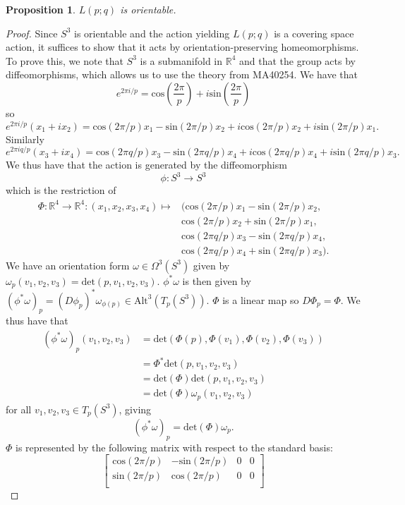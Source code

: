 \documentclass{article}
\newtheorem{proposition}[theorem]{Proposition}
\begin{document}
\begin{proposition}
$L(p;q)$ is orientable.
\end{proposition}
\begin{proof}
Since $S^3$ is orientable and the action yielding $L(p;q)$ is a covering space action, it suffices to show that it acts by orientation-preserving homeomorphisms. To prove this, we note that $S^3$ is a submanifold in $\mathbb{R}^4$ and that the group acts by diffeomorphisms, which allows us to use the theory from MA40254. We have that \[e^{2\pi i/p}=\text{cos}(\frac{2\pi}{p})+i\text{sin}(\frac{2\pi}{p})\]so\[e^{2\pi i/p}(x_1+ix_2)=\text{cos}(2\pi/p)x_1-\text{sin}(2\pi/p)x_2+i\text{cos}(2\pi /p)x_2+i\text{sin}(2\pi/p)x_1.\] Similarly \[e^{2\pi iq/p}(x_3+ix_4)=\text{cos}(2\pi q/p)x_3-\text{sin}(2\pi q/p)x_4+i\text{cos}(2\pi q/p)x_4+i\text{sin}(2\pi q/p)x_3.\] We thus have that the action is generated by the diffeomorphism \[\phi:S^3\to S^3\] which is the restriction of \begin{align*}\Phi:\mathbb{R}^4\to \mathbb{R}^4\colon(x_1,x_2,x_3,x_4)\mapsto &(\text{cos}(2\pi/p)x_1-\text{sin}(2\pi/p)x_2,\\& \text{cos}(2\pi /p)x_2+\text{sin}(2\pi/p)x_1,\\&\text{cos}(2\pi q/p)x_3-\text{sin}(2\pi q/p)x_4, \\&\text{cos}(2\pi q/p)x_4+\text{sin}(2\pi q/p)x_3).\end{align*} We have an orientation form $\omega\in \Omega^3(S^3)$ given by $\omega_p(v_1,v_2,v_3)=\text{det}(p,v_1,v_2,v_3)$. $\phi^*\omega$ is then given by $(\phi^*\omega)_p=(D\phi_p)^*\omega_{\phi(p)}\in\text{Alt}^3(T_p(S^3))$. $\Phi$ is a linear map so $D\Phi_p=\Phi$. We thus have that \begin{align*}(\phi^*\omega)_p(v_1,v_2,v_3)&=\text{det}(\Phi(p),\Phi(v_1),\Phi(v_2),\Phi(v_3))\\&=\Phi^*\text{det}(p,v_1,v_2,v_3)\\&=\text{det}(\Phi)\text{det}(p,v_1,v_2,v_3)\\&=\text{det}(\Phi)\omega_p(v_1,v_2,v_3)\end{align*} for all $v_1,v_2,v_3\in T_p(S^3)$, giving \[(\phi^*\omega)_p=\text{det}(\Phi)\omega_p.\] $\Phi$ is represented by the following matrix with respect to the standard basis:
\[\begin{bmatrix}
    \text{cos}(2\pi/p)       & -\text{sin}(2\pi/p) & 0  & 0 \\
    \text{sin}(2\pi/p)       & \text{cos}(2\pi/p) & 0 & 0 \\

\end{bmatrix}\]
\end{proof}
\end{document}
